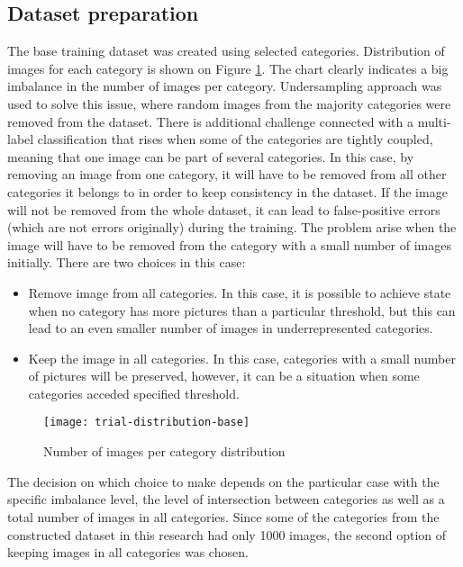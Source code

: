     \subsection{Dataset preparation}
    The base training dataset was created using selected categories. Distribution of images for each category is shown on Figure \ref{fig:trial-distribution-base}. The chart clearly indicates a big imbalance in the number of images per category. Undersampling approach was used to solve this issue, where random images from the majority categories were removed from the dataset. There is additional challenge connected with a multi-label classification that rises when some of the categories are tightly coupled, meaning that one image can be part of several categories. In this case, by removing an image from one category, it will have to be removed from all other categories it belongs to in order to keep consistency in the dataset. If the image will not be removed from the whole dataset, it can lead to false-positive errors (which are not errors originally) during the training. The problem arise when the image will have to be removed from the category with a small number of images initially. There are two choices in this case:
    
    \begin{itemize}
        \item Remove image from all categories. In this case, it is possible to achieve state when no category has more pictures than a particular threshold, but this can lead to an even smaller number of images in underrepresented categories.
        \item Keep the image in all categories. In this case, categories with a small number of pictures will be preserved, however, it can be a situation when some categories acceded specified threshold.
    \end{itemize}
    
    \begin{figure}[h!]
    \centering
    \texttt{[image: trial-distribution-base]}
    \caption{Number of images per category distribution}
    \label{fig:trial-distribution-base}
    \end{figure}
    
    The decision on which choice to make depends on the particular case with the specific imbalance level, the level of intersection between categories as well as a total number of images in all categories. Since some of the categories from the constructed dataset in this research had only 1000 images, the second option of keeping images in all categories was chosen.
    
